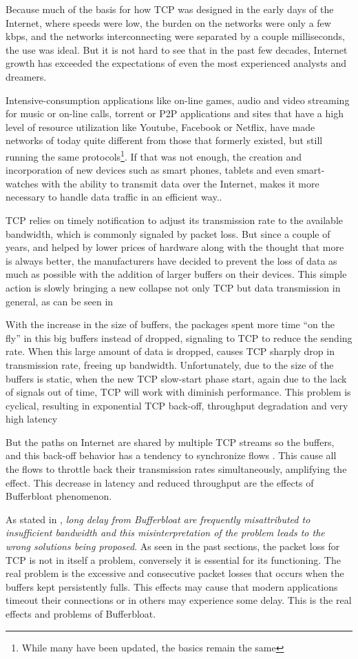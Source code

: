Because much of the basis for how TCP was designed in the early days of the
Internet, where speeds were low, the burden on the networks were only a few
kbps, and the networks interconnecting were separated by a couple
milliseconds, the use was ideal. But it is not hard to see that in the past
few decades, Internet growth has exceeded the expectations of even the most
experienced analysts and dreamers.

Intensive-consumption applications like on-line games, audio and video
streaming for music or on-line calls, torrent or P2P applications and 
sites that have a high level of resource utilization like Youtube, Facebook or
Netflix, have made networks of today quite different from those that formerly
existed, but still running the same protocols\footnote{While many have been
updated, the basics remain the same}. If that was not enough, the creation and
incorporation of new devices such as smart phones, tablets and even smart-watches
with the ability to transmit data over the Internet, makes it more necessary to handle data traffic in an efficient way..

TCP relies on timely notification to adjust its transmission rate to the
available bandwidth, which is commonly signaled by packet loss. But since a
couple of years, and helped by lower prices of hardware along
with the thought that more is always better, the manufacturers have decided to
prevent the loss of data as much as possible with the addition of larger buffers on
their devices. This simple action is slowly bringing a new collapse not only
TCP but data transmission in general, as can be seen in \cite{CACMStaff}

With the increase in the size of buffers, the packages spent more time
``on the fly'' in this big buffers instead of dropped, signaling to TCP to
reduce the sending rate. When this large amount of data is dropped, causes TCP
sharply drop in transmission rate, freeing up bandwidth. Unfortunately, due to
the size of the buffers is static, when the new TCP slow-start phase start,
again due to the lack of signals out of time, TCP will work with diminish
performance. This problem is cyclical, resulting in exponential TCP back-off,
throughput degradation and very high latency

But the paths on Internet are shared by multiple TCP streams so the buffers,
and this back-off behavior has a tendency to synchronize flows
\cite{main:ref:1}. This cause all the flows to throttle back their
transmission rates simultaneously, amplifying the effect. This decrease in
latency and reduced throughput are the effects of Bufferbloat phenomenon.

As stated in \cite{GettysNichols}, \textit{long delay from Bufferbloat are
frequently misattributed to insufficient bandwidth and this misinterpretation
of the problem leads to the wrong solutions being proposed}. As seen in the
past sections, the packet loss for TCP is not in itself a problem, conversely
it is essential for its functioning. The real problem is  the excessive and
consecutive packet losses that occurs when the buffers kept persistently
fulls. This effects may cause that modern applications timeout their
connections or in others may experience some delay. This is the real
effects and problems of Bufferbloat.
